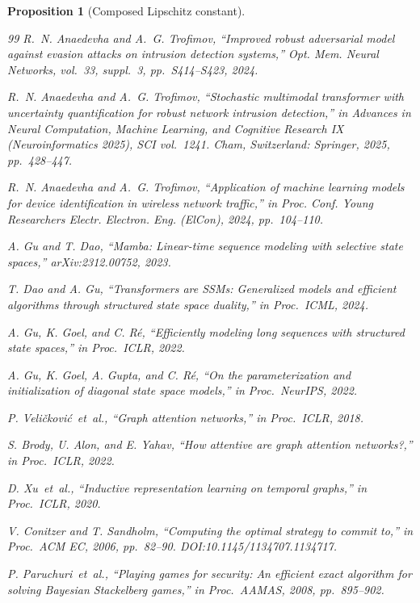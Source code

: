 \documentclass{ieeeaccess}
\newtheorem{proposition}[theorem]{Proposition}
\begin{document}
\begin{proposition}[Composed Lipschitz constant]
\begin{thebibliography}{99}
 R.~N. Anaedevha and A.~G. Trofimov, ``Improved robust adversarial model against evasion attacks on intrusion detection systems,'' \textit{Opt. Mem. Neural Networks}, vol.~33, suppl.~3, pp.~S414--S423, 2024.

 R.~N. Anaedevha and A.~G. Trofimov, ``Stochastic multimodal transformer with uncertainty quantification for robust network intrusion detection,'' in \textit{Advances in Neural Computation, Machine Learning, and Cognitive Research IX (Neuroinformatics 2025)}, SCI vol.~1241. Cham, Switzerland: Springer, 2025, pp.~428--447.

 R.~N. Anaedevha and A.~G. Trofimov, ``Application of machine learning models for device identification in wireless network traffic,'' in \textit{Proc. Conf. Young Researchers Electr. Electron. Eng. (ElCon)}, 2024, pp.~104--110.

 A. Gu and T. Dao, ``Mamba: Linear-time sequence modeling with selective state spaces,'' arXiv:2312.00752, 2023.

 T. Dao and A. Gu, ``Transformers are SSMs: Generalized models and efficient algorithms through structured state space duality,'' in \textit{Proc.\ ICML}, 2024.

 A. Gu, K. Goel, and C. R\'e, ``Efficiently modeling long sequences with structured state spaces,'' in \textit{Proc.\ ICLR}, 2022.

 A. Gu, K. Goel, A. Gupta, and C. R\'e, ``On the parameterization and initialization of diagonal state space models,'' in \textit{Proc.\ NeurIPS}, 2022.

 P. Veli\v{c}kovi\'c~\textit{et~al.}, ``Graph attention networks,'' in \textit{Proc.\ ICLR}, 2018.

 S. Brody, U. Alon, and E. Yahav, ``How attentive are graph attention networks?,'' in \textit{Proc.\ ICLR}, 2022.

 D. Xu~\textit{et~al.}, ``Inductive representation learning on temporal graphs,'' in \textit{Proc.\ ICLR}, 2020.

 V. Conitzer and T. Sandholm, ``Computing the optimal strategy to commit to,'' in \textit{Proc.\ ACM EC}, 2006, pp.~82--90. DOI:10.1145/1134707.1134717.

 P. Paruchuri~\textit{et~al.}, ``Playing games for security: An efficient exact algorithm for solving Bayesian Stackelberg games,'' in \textit{Proc.\ AAMAS}, 2008, pp.~895--902.


\end{thebibliography}
\end{proposition}
\end{document}
